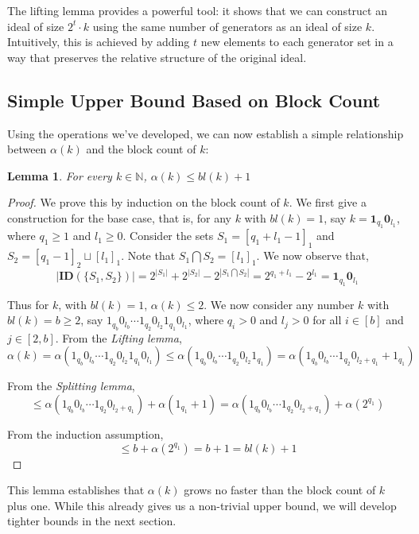\documentclass[11pt,a4paper]{article}
\newtheorem{lemma}[theorem]{Lemma}
\theoremstyle{definition}
\begin{document}
The lifting lemma provides a powerful tool: it shows that we can construct an 
ideal of size $2^t \cdot k$ using the same number of generators as an ideal 
of size $k$. Intuitively, this is achieved by adding $t$ new elements to each 
generator set in a way that preserves the relative structure of the original 
ideal.

\subsection{Simple Upper Bound Based on Block Count}

Using the operations we've developed, we can now establish a simple 
relationship between $\alpha(k)$ and the block count of $k$:

\begin{lemma}\label{simple_upper_bound}
	For every $k\in \mathbb{N}$, $\alpha(k)\leq {bl(k)}+1$    
\end{lemma}

\begin{proof}
	We prove this by induction on the block count of $k$. We first give a 
	construction for the base case, that is, for any $k$ with $bl(k)=1$, say 
	$k=\mathbf{1}_{q_1} \mathbf{0}_{l_1}$, where $q_1\geq 1$ and $l_1\geq 0$. 
	Consider the sets $S_1=[q_1+l_1-1]_1$ and $S_2=[q_1-1]_2\sqcup [l_1]_1$. 
	Note that $S_1 \bigcap S_2 = [l_1]_1$. We now observe that,
	$$ |\mathbf{ID}(\{S_1,S_2\})| = 2^{|S_1|}+2^{|S_2|}-2^{|S_1\bigcap S_2|} = 
	2^{q_1+l_1}-2^{l_1} = \mathbf{1}_{q_1} \mathbf{0}_{l_1}$$
	
	Thus for $k$, with $bl(k)=1$, $\alpha(k) \leq 2$. We now consider any number 
	$k$ with $bl(k)=b \geq 2$, say $1_{q_b}0_{l_b}\cdots1_{q_2}0_{l_2}1_{q_1}
	0_{l_1}$, where $q_i> 0$ and $l_j> 0$ for all $i\in [b]$ and $j \in [2,b]$. 
	From the \textit{Lifting lemma}, 
	$$\alpha(k) = \alpha (1_{q_b}0_{l_b}\cdots1_{q_2}0_{l_2}1_{q_1}0_{l_1}) 
	\leq \alpha (1_{q_b}0_{l_b}\cdots1_{q_2}0_{l_2}1_{q_1}) = \alpha 
	(1_{q_b}0_{l_b}\cdots1_{q_2}0_{l_2+q_1}+1_{q_1})$$
	
	From the \textit{Splitting lemma}, 
	$$ \leq \alpha (1_{q_b}0_{l_b}\cdots1_{q_2}0_{l_2+q_1})+\alpha(1_{q_1}+1) = 
	\alpha (1_{q_b}0_{l_b}\cdots1_{q_2}0_{l_2+q_1})+\alpha(2^{q_1})$$
	
	From the induction assumption, 
	$$ \leq b+\alpha(2^{q_1}) = b+1=bl(k)+1$$
\end{proof}

This lemma establishes that $\alpha(k)$ grows no faster than the block count 
of $k$ plus one. While this already gives us a non-trivial upper bound, we 
will develop tighter bounds in the next section.
\end{document}
